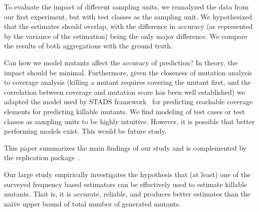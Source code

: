 \documentclass[sigconf,review,anonymous]{acmart}
\newcommand{\estimatorCount}{twelve\xspace}
\newcommand{\projectCount}{ten\xspace}
\newcommand{\PIT}{\textsc{PIT}\xspace}
\begin{document}
To evaluate the impact of different sampling units, we reanalyzed the
data from our first experiment, but with test classes as the sampling unit.
We hypothesized that the estimates should overlap, with the difference in
accuracy (as represented by the variance of the estimation) being the only major
difference. We compare the results of both aggregations with the ground truth.




Can how we model mutants affect the accuracy of prediction? In theory, the
impact should be minimal.
Furthermore, given the closeness of mutation analysis
to coverage analysis (killing a mutant requires covering the mutant first, and
the correlation between coverage and mutation score has been well established)
we adapted the model used by STADS framework~\cite{bohme2018stads} for
predicting reachable coverage elements for predicting killable mutants. We find
modeling of test cases or test classes as sampling units to be highly intuitive.
However, it is possible that better performing models exist. This would be
future study.





This paper summarizes 
the main findings of our study and is complemented by
the replication package~\cite{replication-package}.

\begin{tcolorbox}[boxrule=0.5pt, arc=4pt, boxsep=0pt, width=\columnwidth]
Our large study empirically investigates the hypothesis that (at least)
one of the surveyed frequency based estimators can be effectively used to
estimate killable mutants.
That is, it is accurate, reliable, and
produces better estimates than the nai\"ve upper bound of total
number of generated mutants.
\end{tcolorbox}
\end{document}
